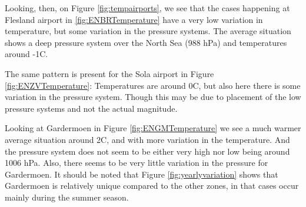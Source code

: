 Looking, then, on Figure \ref{fig:tempairports}, we see that the cases happening at Flesland airport in \ref{fig:ENBRTemperature} have a very low variation in temperature, but some variation in the pressure systems. The average situation shows a deep pressure system over the North Sea (988 hPa) and temperatures around -1C. 

The same pattern is present for the Sola airport in Figure \ref{fig:ENZVTemperature}: Temperatures are around 0C, but also here there is some variation in the pressure system. Though this may be due to placement of the low pressure systems and not the actual magnitude. 

Looking at Gardermoen in Figure \ref{fig:ENGMTemperature} we see a much warmer average situation around 2C, and with more variation in the temperature. And the pressure system does not seem to be either very high nor low being around 1006 hPa. Also, there seems to be very little variation in the pressure for Gardermoen. It should be noted that Figure \ref{fig:yearlyvariation} shows that Gardermoen is relatively unique compared to the other zones, in that cases occur mainly during the summer season.

